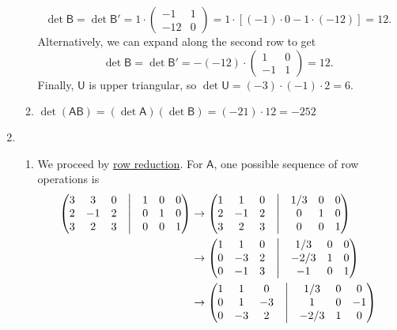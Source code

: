 \begin{enumerate}
\begin{enumerate}
\begin{equation*}
\det\mathsf{B} = \det\mathsf{B}' = 1\cdot\begin{pmatrix} -1 & 1 \\ -12 & 0 \end{pmatrix} = 1\cdot [(-1)\cdot 0 - 1\cdot (-12)] = 12.
\end{equation*}
Alternatively, we can expand along the second row to get
\begin{equation*}
\det\mathsf{B} = \det\mathsf{B}' = -(-12)\cdot\begin{pmatrix} 1 & 0 \\ -1 & 1 \end{pmatrix} = 12.
\end{equation*}
Finally, $\mathsf{U}$ is upper triangular, so $\det\mathsf{U} = (-3)\cdot (-1)\cdot 2 = 6$.
\item $\det(\mathsf{AB}) = (\det\mathsf{A})(\det\mathsf{B}) = (-21)\cdot 12 = -252$
\end{enumerate}
\newpage
\item \begin{enumerate}
\item We proceed by \href{https://en.wikipedia.org/wiki/Gaussian_elimination#Finding_the_inverse_of_a_matrix}{row reduction}. For $\mathsf{A}$, one possible sequence of row operations is
\begin{align*}
\begin{pmatrix} 3 & 3 & 0 & \bigm| & 1 & 0 & 0 \\ 2 & -1 & 2 & \bigm| & 0 & 1 & 0 \\ 3 & 2 & 3 & \bigm| & 0 & 0 & 1 \end{pmatrix} &\rightarrow \begin{pmatrix} 1 & 1 & 0 & \bigm| & 1/3 & 0 & 0 \\ 2 & -1 & 2 & \bigm| & 0 & 1 & 0 \\ 3 & 2 & 3 & \bigm| & 0 & 0 & 1 \end{pmatrix} \\
&\rightarrow \begin{pmatrix} 1 & 1 & 0 & \bigm| & 1/3 & 0 & 0 \\ 0 & -3 & 2 & \bigm| & -2/3 & 1 & 0 \\ 0 & -1 & 3 & \bigm| & -1 & 0 & 1 \end{pmatrix} \\
&\rightarrow \begin{pmatrix} 1 & 1 & 0 & \bigm| & 1/3 & 0 & 0 \\ 0 & 1 & -3 & \bigm| & 1 & 0 & -1 \\ 0 & -3 & 2 & \bigm| & -2/3 & 1 & 0 \end{pmatrix} \\

\end{align*}
\end{enumerate}
\end{enumerate}
